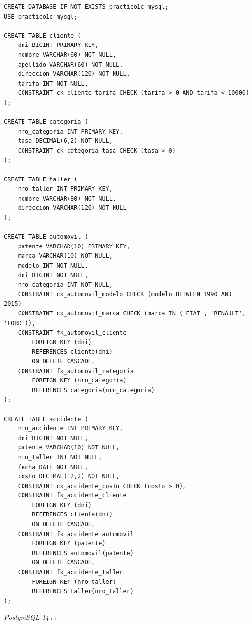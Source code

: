 \documentclass[11pt,a4paper]{article}
\begin{document}
\begin{lstlisting}
CREATE DATABASE IF NOT EXISTS practico1c_mysql;
USE practico1c_mysql;

CREATE TABLE cliente (
    dni BIGINT PRIMARY KEY,
    nombre VARCHAR(60) NOT NULL,
    apellido VARCHAR(60) NOT NULL,
    direccion VARCHAR(120) NOT NULL,
    tarifa INT NOT NULL,
    CONSTRAINT ck_cliente_tarifa CHECK (tarifa > 0 AND tarifa < 10000)
);

CREATE TABLE categoria (
    nro_categoria INT PRIMARY KEY,
    tasa DECIMAL(6,2) NOT NULL,
    CONSTRAINT ck_categoria_tasa CHECK (tasa > 0)
);

CREATE TABLE taller (
    nro_taller INT PRIMARY KEY,
    nombre VARCHAR(80) NOT NULL,
    direccion VARCHAR(120) NOT NULL
);

CREATE TABLE automovil (
    patente VARCHAR(10) PRIMARY KEY,
    marca VARCHAR(10) NOT NULL,
    modelo INT NOT NULL,
    dni BIGINT NOT NULL,
    nro_categoria INT NOT NULL,
    CONSTRAINT ck_automovil_modelo CHECK (modelo BETWEEN 1990 AND 2015),
    CONSTRAINT ck_automovil_marca CHECK (marca IN ('FIAT', 'RENAULT', 'FORD')),
    CONSTRAINT fk_automovil_cliente
        FOREIGN KEY (dni)
        REFERENCES cliente(dni)
        ON DELETE CASCADE,
    CONSTRAINT fk_automovil_categoria
        FOREIGN KEY (nro_categoria)
        REFERENCES categoria(nro_categoria)
);

CREATE TABLE accidente (
    nro_accidente INT PRIMARY KEY,
    dni BIGINT NOT NULL,
    patente VARCHAR(10) NOT NULL,
    nro_taller INT NOT NULL,
    fecha DATE NOT NULL,
    costo DECIMAL(12,2) NOT NULL,
    CONSTRAINT ck_accidente_costo CHECK (costo > 0),
    CONSTRAINT fk_accidente_cliente
        FOREIGN KEY (dni)
        REFERENCES cliente(dni)
        ON DELETE CASCADE,
    CONSTRAINT fk_accidente_automovil
        FOREIGN KEY (patente)
        REFERENCES automovil(patente)
        ON DELETE CASCADE,
    CONSTRAINT fk_accidente_taller
        FOREIGN KEY (nro_taller)
        REFERENCES taller(nro_taller)
);
\end{lstlisting}

\textit{PostgreSQL 14+:}
\end{document}
